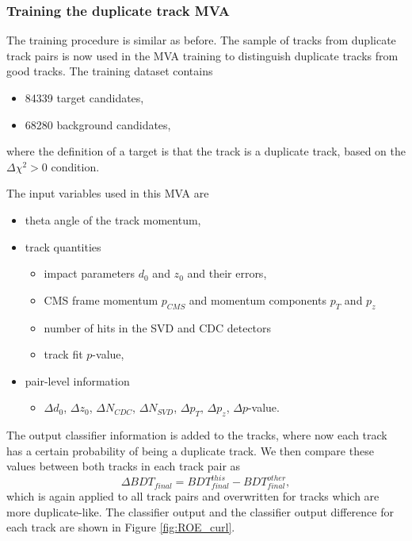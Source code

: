 \subsubsection{Training the duplicate track MVA}
The training procedure is similar as before. The sample of tracks from duplicate track pairs is now used in the MVA training to distinguish duplicate tracks from good tracks. The training dataset contains
\begin{itemize}
	\item 84339 target candidates,
	\item 68280 background candidates,
\end{itemize}
where the definition of a target is that the track is a duplicate track, based on the $\Delta \chi^2 > 0$ condition.

The input variables used in this MVA are
\begin{itemize}
	\item theta angle of the track momentum,
	\item track quantities
	\begin{itemize}
		\item impact parameters $d_0$ and $z_0$ and their errors,
		\item CMS frame momentum $p_{CMS}$ and momentum components $p_T$ and $p_z$ 
		\item number of hits in the SVD and CDC detectors
		\item track fit $p$-value,
	\end{itemize}
	\item pair-level information
	\begin{itemize}
		\item $\Delta d_0$, $\Delta z_0$, $\Delta N_{CDC}$, $\Delta N_{SVD}$, $\Delta p_T$, $\Delta p_z$, $\Delta p$-value.  
	\end{itemize}
\end{itemize}

The output classifier information is added to the tracks, where now each track has a certain probability of being a duplicate track. We then compare these values between both tracks in each track pair as
\begin{equation}
\Delta BDT_{final} = BDT_{final}^{this} - BDT_{final}^{other},
\end{equation}
which is again applied to all track pairs and overwritten for tracks which are more duplicate-like. The classifier output and the classifier output difference for each track are shown in Figure \ref{fig:ROE_curl}. 

